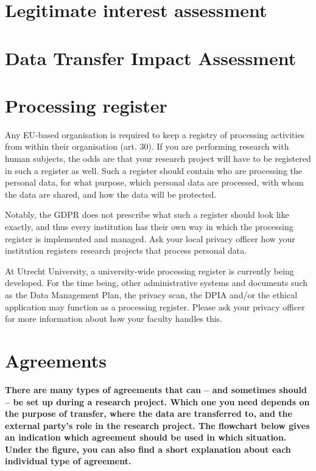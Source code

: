 \documentclass[
]{book}
\begin{document}
\hypertarget{legitimate-interest-assessment}{%
\section{Legitimate interest assessment}\label{legitimate-interest-assessment}}

\hypertarget{dtia}{%
\section{Data Transfer Impact Assessment}\label{dtia}}

\hypertarget{processing-register}{%
\section{Processing register}\label{processing-register}}

Any EU-based organisation is required to keep a registry of processing
activities from within their organisation
(art. 30).
If you are performing research with human subjects, the odds are that your
research project will have to be registered in such a register as well. Such a
register should contain who are processing the personal data, for what purpose,
which personal data are processed, with whom the data are shared, and how the
data will be protected.

Notably, the GDPR does not prescribe what such a register should look like
exactly, and thus every institution has their own way in which the processing
register is implemented and managed. Ask your local privacy officer how your
institution registers research projects that process personal data.

At Utrecht University, a university-wide processing register is currently being
developed. For the time being, other administrative systems and documents such as
the Data Management Plan, the privacy scan, the DPIA and/or the ethical
application may function as a processing register. Please ask your
privacy officer
for more information about how your faculty handles this.

\hypertarget{agreements}{%
\section{Agreements}\label{agreements}}

\textbf{There are many types of agreements that can -- and sometimes should -- be set up
during a research project. Which one you need depends on the purpose of transfer,
where the data are transferred to, and the external party's role in the research
project. The flowchart below gives an indication which agreement should be used
in which situation. Under the figure, you can also find a short explanation
about each individual type of agreement.}
\end{document}

